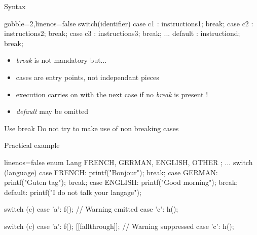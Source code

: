 \begin{frame}[fragile]
  \begin{block}{Syntax}
    \begin{cppcode*}{gobble=2,linenos=false}
      switch(identifier) {
        case c1 : instructions1; break;
        case c2 : instructions2; break;
        case c3 : instructions3; break;
        ...
        default : instructiond; break;
      }
    \end{cppcode*}
    \vspace{-0.5cm}
    \begin{itemize}
      \item {\it break} is not mandatory but...
      \item cases are entry points, not independant pieces
      \item execution carries on with the next case if no {\it break} is present !
      \item {\it default} may be omitted
    \end{itemize}
  \end{block}
  \pause
  \begin{alertblock}{Use break}
    Do not try to make use of non breaking cases
  \end{alertblock}
\end{frame}

\begin{frame}[fragile]
  \begin{exampleblock}{Practical example}
    \begin{cppcode*}{linenos=false}
      enum Lang { FRENCH, GERMAN, ENGLISH, OTHER };
      ...
      switch (language) {
      case FRENCH:
        printf("Bonjour");
        break;
      case GERMAN:
        printf("Guten tag");
        break;
      case ENGLISH:
        printf("Good morning");
        break;
      default:
        printf("I do not talk your langage");
      }
    \end{cppcode*}
  \end{exampleblock}
\end{frame}


\begin{frame}[fragile]
  \begin{alertblock}{}
    \begin{cppcode}
      switch (c) {
        case 'a':
          f(); // Warning emitted
        case 'c':
          h();
      }
    \end{cppcode}
  \end{alertblock}
  \begin{exampleblock}{}
    \begin{cppcode*}{}
      switch (c) {
        case 'a':
          f();
          [[fallthrough]]; // Warning suppressed
        case 'c':
          h();
      }
    \end{cppcode*}
  \end{exampleblock}
\end{frame}

